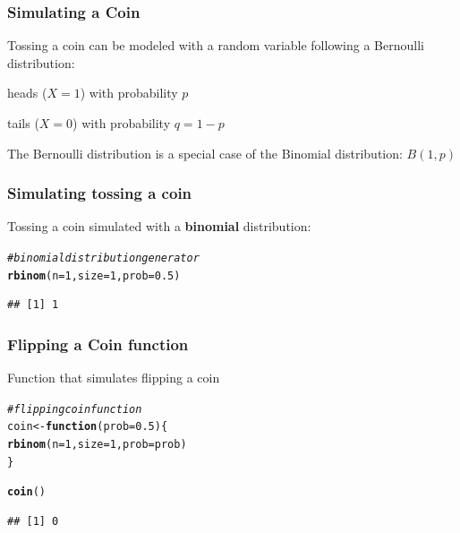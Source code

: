 \documentclass[12pt]{beamer}\usepackage[]{graphicx}\usepackage[]{color}
\makeatletter
\newcommand{\hlnum}[1]{\textcolor[rgb]{0.686,0.059,0.569}{#1}}%
\newcommand{\hlcom}[1]{\textcolor[rgb]{0.678,0.584,0.686}{\textit{#1}}}%
\newcommand{\hlstd}[1]{\textcolor[rgb]{0.345,0.345,0.345}{#1}}%
\newcommand{\hlkwa}[1]{\textcolor[rgb]{0.161,0.373,0.58}{\textbf{#1}}}%
\newcommand{\hlkwb}[1]{\textcolor[rgb]{0.69,0.353,0.396}{#1}}%
\newcommand{\hlkwc}[1]{\textcolor[rgb]{0.333,0.667,0.333}{#1}}%
\newcommand{\hlkwd}[1]{\textcolor[rgb]{0.737,0.353,0.396}{\textbf{#1}}}%
\newenvironment{kframe}{%
 \def\at@end@of@kframe{}%
 \ifinner\ifhmode%
  \def\at@end@of@kframe{\end{minipage}}%
  \begin{minipage}{\columnwidth}%
 \fi\fi%
 \def\FrameCommand##1{\hskip\@totalleftmargin \hskip-\fboxsep
 \colorbox{shadecolor}{##1}\hskip-\fboxsep
     \hskip-\linewidth \hskip-\@totalleftmargin \hskip\columnwidth}%
 \MakeFramed {\advance\hsize-\width
   \@totalleftmargin\z@ \linewidth\hsize
   \@setminipage}}%
 {\par\unskip\endMakeFramed%
 \at@end@of@kframe}
\newenvironment{knitrout}{}{} %
\makeatother
\begin{document}

\begin{frame}[fragile]
\frametitle{Simulating a Coin}

Tossing a coin can be modeled with a random variable following a Bernoulli distribution:
\bi
  \item heads ($X = 1$) with probability $p$
  \item tails ($X = 0$) with probability $q = 1 - p$
\ei

\bigskip
{\footnotesize The Bernoulli distribution is a special case of the Binomial distribution: $B(1, p)$}

\end{frame}


\begin{frame}[fragile]
\frametitle{Simulating tossing a coin}

Tossing a coin simulated with a \textbf{binomial} distribution: 
\begin{knitrout}\footnotesize
{}\color{fgcolor}\begin{kframe}
\begin{alltt}
\hlcom{# binomial distribution generator}
\hlkwd{rbinom}\hlstd{(}\hlkwc{n} \hlstd{=} \hlnum{1}\hlstd{,} \hlkwc{size} \hlstd{=} \hlnum{1}\hlstd{,} \hlkwc{prob} \hlstd{=} \hlnum{0.5}\hlstd{)}
\end{alltt}
\begin{verbatim}
## [1] 1
\end{verbatim}
\end{kframe}
\end{knitrout}

\end{frame}


\begin{frame}[fragile]
\frametitle{Flipping a Coin function}

Function that simulates flipping a coin
\begin{knitrout}\footnotesize
{}\color{fgcolor}\begin{kframe}
\begin{alltt}
\hlcom{# flipping coin function}
\hlstd{coin} \hlkwb{<-} \hlkwa{function}\hlstd{(}\hlkwc{prob} \hlstd{=} \hlnum{0.5}\hlstd{) \{}
  \hlkwd{rbinom}\hlstd{(}\hlkwc{n} \hlstd{=} \hlnum{1}\hlstd{,} \hlkwc{size} \hlstd{=} \hlnum{1}\hlstd{,} \hlkwc{prob} \hlstd{= prob)}
\hlstd{\}}

\hlkwd{coin}\hlstd{()}
\end{alltt}
\begin{verbatim}
## [1] 0
\end{verbatim}
\end{kframe}
\end{knitrout}

\end{frame}
\end{document}
